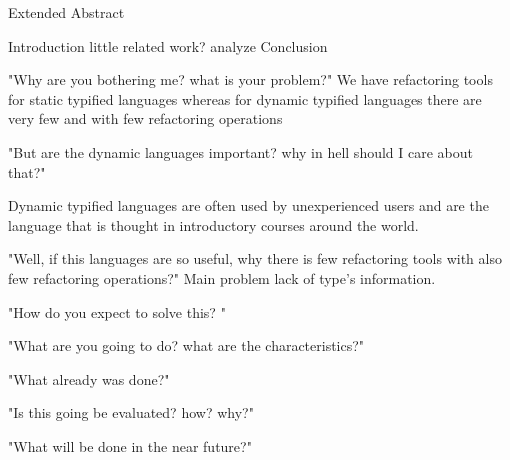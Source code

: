 Extended Abstract


Introduction
little related work?
analyze
Conclusion

"Why are you bothering me? what is your problem?"
We have refactoring tools for static typified languages whereas for dynamic typified languages there are very few and with few refactoring operations



"But are the dynamic languages important? why in hell should I care about that?"

Dynamic typified languages are often used by unexperienced users and are the language that is thought in introductory courses around the world.

"Well, if this languages are so useful, why there is few refactoring tools with also few refactoring operations?"
Main problem lack of type's information.

"How do you expect to solve this? "

"What are you going to do? what are the characteristics?"

"What already was done?"

"Is this going be evaluated? how? why?"

"What will be done in the near future?"

